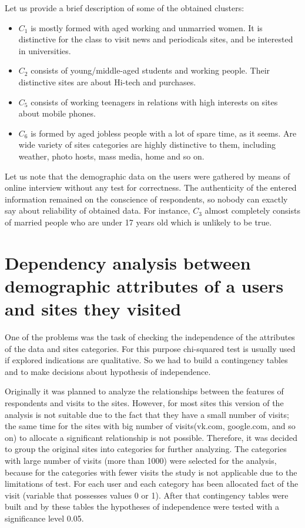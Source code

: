 \documentclass[runningheads,a4paper]{llncs}
\begin{document}
Let us provide a brief description of some of the obtained clusters:
\begin{itemize}
	\item $C_1$ is mostly formed with aged working and unmarried women. It is distinctive for the class to visit news and periodicals sites, and be interested in universities.
    
    \item $C_2$ consists of young/middle-aged students and working people. Their distinctive sites are about Hi-tech and purchases.

	\item $C_5$ consists of working teenagers in relations with high interests on sites about mobile phones.
    
	\item $C_6$ is formed by aged jobless people with a lot of spare time, as it seems. Are wide variety of sites categories are highly distinctive to them, including weather, photo hosts, mass media, home and so on.
\end{itemize}

Let us note that the demographic data on the users were gathered by means of online interview without any test for correctness. The authenticity of the entered information remained on the conscience of respondents, so nobody can exactly say about reliability of obtained data. For instance, $C_3$ almost completely consists of married people who are under 17 years old which is unlikely to be true.


\section{Dependency analysis between demographic attributes of a users and sites they visited}



One of the problems was the task of checking the independence of the attributes of the data and sites categories. For this purpose chi-squared test is usually used if explored indications are qualitative. So we had to build a contingency tables and to make decisions about hypothesis of independence.

Originally it was planned to analyze the relationships between the features of respondents and visits to the sites. However, for most sites this version of the analysis is not suitable due to the fact that they have a small number of visits; the same time for the sites with big number of visits(vk.com, google.com, and so on) to allocate a significant relationship is not possible. Therefore, it was decided to group the original sites into categories for further analyzing. The categories with large number of visits (more than 1000) were selected for the analysis, because for the categories with fewer visits the study is not applicable due to the limitations of test. For each user and each category has been allocated fact of the visit (variable that possesses values 0 or 1). After that contingency tables were built and by these tables the hypotheses of independence were tested with a significance level 0.05.
\end{document}
